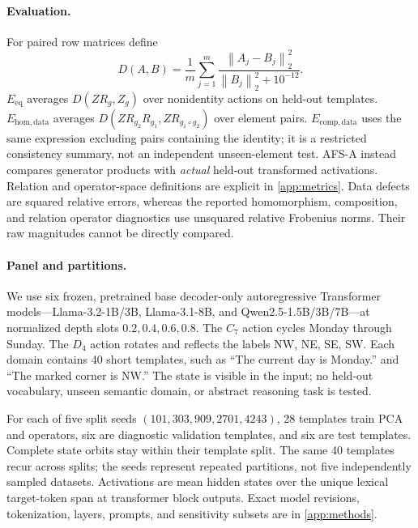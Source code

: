 \documentclass[10pt]{article}
\newcommand{\norm}[1]{\left\lVert #1\right\rVert}
\newcommand{\Eeq}{E_{\mathrm{eq}}}
\newcommand{\Ehom}{E_{\mathrm{hom,data}}}
\newcommand{\Ecomp}{E_{\mathrm{comp,data}}}
\begin{document}
\paragraph{Evaluation.}
For paired row matrices define
\begin{equation}
 D(A,B)=\frac{1}{m}\sum_{j=1}^m
 \frac{\norm{A_j-B_j}_2^2}{\norm{B_j}_2^2+10^{-12}}.
 \label{eq:D}
\end{equation}
$\Eeq$ averages $D(ZR_g,Z_g)$ over nonidentity actions on held-out templates. $\Ehom$ averages $D(ZR_{g_2}R_{g_1},ZR_{g_1\circ g_2})$ over element pairs. $\Ecomp$ uses the same expression excluding pairs containing the identity; it is a restricted consistency summary, not an independent unseen-element test. AFS-A instead compares generator products with \emph{actual} held-out transformed activations. Relation and operator-space definitions are explicit in \cref{app:metrics}. Data defects are squared relative errors, whereas the reported homomorphism, composition, and relation operator diagnostics use unsquared relative Frobenius norms. Their raw magnitudes cannot be directly compared.

\paragraph{Panel and partitions.}
\label{sec:design}
We use six frozen, pretrained base decoder-only autoregressive Transformer models---Llama-3.2-1B/3B, Llama-3.1-8B, and Qwen2.5-1.5B/3B/7B---at normalized depth slots $0.2,0.4,0.6,0.8$. The $C_7$ action cycles Monday through Sunday. The $D_4$ action rotates and reflects the labels NW, NE, SE, SW. Each domain contains 40 short templates, such as ``The current day is Monday.'' and ``The marked corner is NW.'' The state is visible in the input; no held-out vocabulary, unseen semantic domain, or abstract reasoning task is tested.

For each of five split seeds $(101,303,909,2701,4243)$, 28 templates train PCA and operators, six are diagnostic validation templates, and six are test templates. Complete state orbits stay within their template split. The same 40 templates recur across splits; the seeds represent repeated partitions, not five independently sampled datasets. Activations are mean hidden states over the unique lexical target-token span at transformer block outputs. Exact model revisions, tokenization, layers, prompts, and sensitivity subsets are in \cref{app:methods}.
\end{document}
